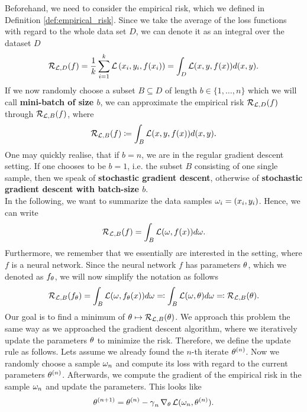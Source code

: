 Beforehand, we need to consider the empirical risk, which we defined in Definition \ref{def:empirical_risk}. Since we take the average of the loss functions with regard to the whole data set $D$, we can denote it as an integral over the dataset $D$
\begin{align*}
\operatorname{\mathcal{R}}_{\operatorname{\mathcal{L}}, D} (f) = \frac{1}{k} \sum_{i=1}^{k} \operatorname{\mathcal{L}}\left(x_i, y_i, f(x_i)\right) = \int_{D} \operatorname{\mathcal{L}}(x,y,f(x)) d(x,y).
\end{align*}
If we now randomly choose a subset $B \subseteq D$ of length $b\in\{1,\ldots,n\}$ which we will call \textbf{mini-batch of size $b$}, we can approximate the empirical risk $\operatorname{\mathcal{R}}_{\operatorname{\mathcal{L}}, D} (f)$ through $\operatorname{\mathcal{R}}_{\operatorname{\mathcal{L}}, B} (f)$, where
\begin{align*}
\operatorname{\mathcal{R}}_{\operatorname{\mathcal{L}},B}(f) \coloneqq \int_{B}\operatorname{\mathcal{L}}(x, y, f(x)) d(x,y).
\end{align*}
One may quickly realise, that if $b=n$, we are in the regular gradient descent setting. If one chooses to be $b=1$, i.e. the subset $B$ consisting of one single sample, then we speak of \textbf{stochastic gradient descent}, otherwise of \textbf{stochastic gradient descent with batch-size $b$}.\\
In the following, we want to summarize the data samples $\omega_i=(x_i,y_i)$. Hence, we can write
\begin{align*}
\operatorname{\mathcal{R}}_{\operatorname{\mathcal{L}},B}(f) = \int_{B}\operatorname{\mathcal{L}}(\omega, f(x)) d\omega.
\end{align*}
Furthermore, we remember that we essentially are interested in the setting, where $f$ is a neural network. Since the neural network $f$ has parameters $\theta$, which we denoted as $f_{\theta}$, we will now simplify the notation as follows
\begin{align*}
\operatorname{\mathcal{R}}_{\operatorname{\mathcal{L}},B}(f_{\theta}) = \int_{B}\operatorname{\mathcal{L}}(\omega, f_{\theta}(x)) d\omega \eqqcolon \int_{B}\operatorname{\mathcal{L}}(\omega,\theta) d\omega \eqqcolon \operatorname{\mathcal{R}}_{\operatorname{\mathcal{L}},B}(\theta).
\end{align*}
Our goal is to find a minimum of $\theta \mapsto\operatorname{\mathcal{R}}_{\operatorname{\mathcal{L}},B} (\theta)$. We approach this problem the same way as we approached the gradient descent algorithm, where we iteratively update the parameters $\theta$ to minimize the risk. Therefore, we define the update rule as follows. Lets assume we already found the $n$-th iterate $\theta^{(n)}$. Now we randomly choose a sample $\omega_n$ and compute its loss with regard to the current parameters $\theta^{(n)}$. Afterwards, we compute the gradient of the empirical risk in the sample $\omega_n$ and update the parameters. This looks like
\begin{align}\label{eq:sgd}
\theta^{(n+1)} = \theta^{(n)} -\operatorname{\gamma}_n \nabla_{\theta} \operatorname{\mathcal{L}}(\omega_n,\theta^{(n)}).
\end{align}
